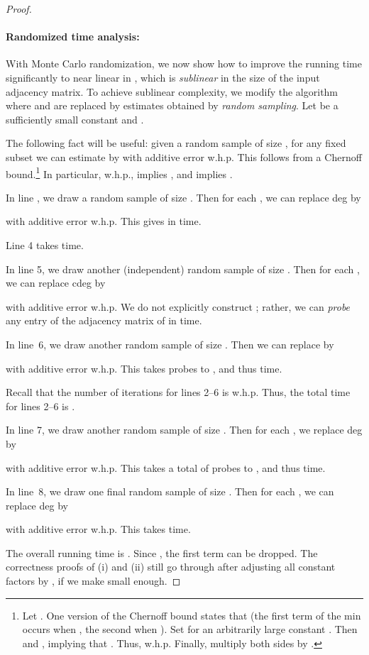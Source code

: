 \documentclass[11pt]{article}
\begin{document}
{\begin{proof}
\paragraph{Randomized time analysis:}
With Monte Carlo randomization, we now show how to improve the running time significantly to near linear in , which is
\emph{sublinear} in the size of the input adjacency matrix.
To achieve sublinear complexity, we modify the algorithm where  and 
are replaced by estimates obtained by \emph{random sampling}.
Let  be a sufficiently small constant and .

The following fact will be useful: given a random sample  of size , for any fixed subset 
we can estimate  by  with additive error 
w.h.p.  This follows from a Chernoff bound.\footnote{
Let .  One version of the Chernoff bound
states that 
(the first term of the min occurs when , the second
when ).  Set  for an arbitrarily large constant .  Then  and , implying that .  Thus,
 w.h.p.  Finally, multiply both sides by .
}
In particular, w.h.p.,  implies , and  implies
.

In line , we draw a random sample  of size .
Then for each , we can replace deg by

with additive error  w.h.p.
This gives  in  time.

Line 4 takes  time.

In line 5, we draw another (independent) random sample  of size .
Then for each , we can replace cdeg by

with additive error  w.h.p.
We do not explicitly construct ; rather, we can \emph{probe} any entry of
the adjacency matrix of  in  time.

In line~6, we draw another random sample  of size .
Then we can replace  by

with additive error  w.h.p.
This takes  probes to , and thus  time.

Recall that the number of iterations for lines 2--6 is  w.h.p.
Thus, the total time for lines 2--6 is .

In line 7, we draw another random sample  of size .
Then for each , we replace
deg by

with additive error  w.h.p.
This takes a total of 
probes to , and thus  time.

In line~8,  we draw one final random sample  of size .
Then for each , we can replace deg by

with additive error  w.h.p.
This takes  time.


The overall running time is .
Since , the first term can
be dropped.
The correctness proofs of (i) and (ii) still go through
after adjusting all constant factors by , if we make
 small enough.
\end{proof}

}
\end{document}
